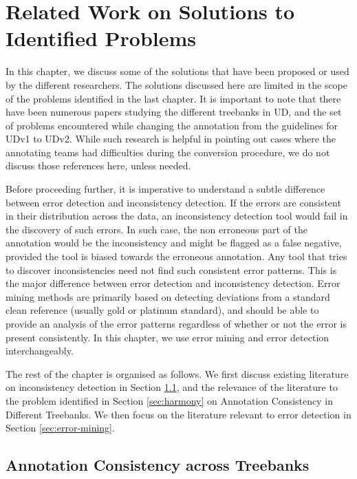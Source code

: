 \chapter{Related Work on Solutions to Identified Problems}
\label{chap:prev_research}

In this chapter, we discuss some of the solutions that have been proposed or used by the different researchers. The solutions discussed here are limited in the scope of the problems identified in the last chapter. It is important to note that there have been numerous papers studying the different treebanks in UD, and the set of problems encountered while changing the annotation from the guidelines for UDv1 to UDv2. While such research is helpful in pointing out cases where the annotating teams had difficulties during the conversion procedure, we do not discuss those references here, unless needed.

Before proceeding further, it is imperative to understand a subtle difference between error detection and inconsistency detection. If the errors are consistent in their distribution across the data, an inconsistency detection tool would fail in the discovery of such errors. In such case, the non erroneous part of the annotation would be the inconsistency and might be flagged as a false negative, provided the tool is biased towards the erroneous annotation. Any tool that tries to discover inconsistencies need not find such consistent error patterns. This is the major difference between error detection and inconsistency detection. Error mining methods are primarily based on detecting deviations from a standard clean reference (usually gold or platinum standard), and should be able to provide an analysis of the error patterns regardless of whether or not the error is present consistently. In this chapter, we use error mining and error detection interchangeably.

The rest of the chapter is organised as follows. We first discuss existing literature on inconsistency detection in Section \ref{sec:inconsistency-detection}, and the relevance of the literature to the problem identified in Section \ref{sec:harmony} on Annotation Consistency in Different Treebanks. We then focus on the literature relevant to error detection in Section \ref{sec:error-mining}.

\section{Annotation Consistency across Treebanks}
\label{sec:inconsistency-detection}

